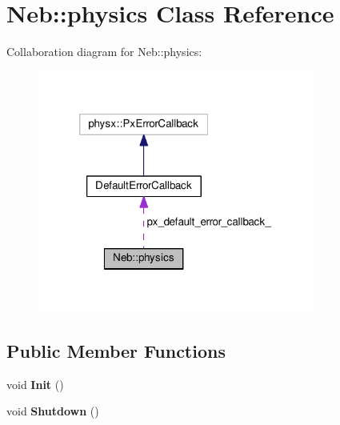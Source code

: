 \hypertarget{classNeb_1_1physics}{\section{Neb\-:\-:physics Class Reference}
\label{classNeb_1_1physics}
}


Collaboration diagram for Neb\-:\-:physics\-:
\nopagebreak
\begin{figure}[H]
\begin{center}
\leavevmode
\includegraphics[width=259pt]{classNeb_1_1physics__coll__graph}
\end{center}
\end{figure}
\subsection*{Public Member Functions}
\begin{DoxyCompactItemize}
\item 
\hypertarget{classNeb_1_1physics_ad38feaab86cbbe5bb07fa0e26f7642e0}{void {\bfseries Init} ()}\label{classNeb_1_1physics_ad38feaab86cbbe5bb07fa0e26f7642e0}

\item 
\hypertarget{classNeb_1_1physics_a7ff5f3e6a5d15ae6ac2f19860785e13e}{void {\bfseries Shutdown} ()}\label{classNeb_1_1physics_a7ff5f3e6a5d15ae6ac2f19860785e13e}

\end{DoxyCompactItemize}
